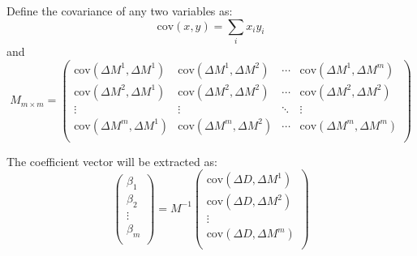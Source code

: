 Define the covariance of any two variables as:
\begin{equation}
    \text{cov}(x, y) = \sum_i x_i y_i
\end{equation}
and
\begin{equation}
    M_{m \times m} = 
    \begin{pmatrix}
	\text{cov}(\Delta M^1, \Delta M^1) & \text{cov}(\Delta M^1, \Delta M^2)   & \cdots & \text{cov}(\Delta M^1, \Delta M^m)  \\
	\text{cov}(\Delta M^2, \Delta M^1) & \text{cov}(\Delta M^2, \Delta M^2)   & \cdots & \text{cov}(\Delta M^2, \Delta M^2)  \\
	\vdots	& \vdots    & \ddots	& \vdots    \\
	\text{cov}(\Delta M^m, \Delta M^1) & \text{cov}(\Delta M^m, \Delta M^2)   & \cdots & \text{cov}(\Delta M^m, \Delta M^m)  \\
    \end{pmatrix}
    \label{eq:M_definition}
\end{equation}

The coefficient vector will be extracted as:
\begin{equation}
    \begin{pmatrix}
	\beta_1 \\
	\beta_2 \\
	\vdots	\\
	\beta_m \\ 
    \end{pmatrix}
    =
    M^{-1}
    \begin{pmatrix}
	\text{cov}(\Delta D, \Delta M^1)   \\
	\text{cov}(\Delta D, \Delta M^2)   \\
	\vdots	\\
	\text{cov}(\Delta D, \Delta M^m)   \\
    \end{pmatrix}
    \label{eq:slope}
\end{equation}

